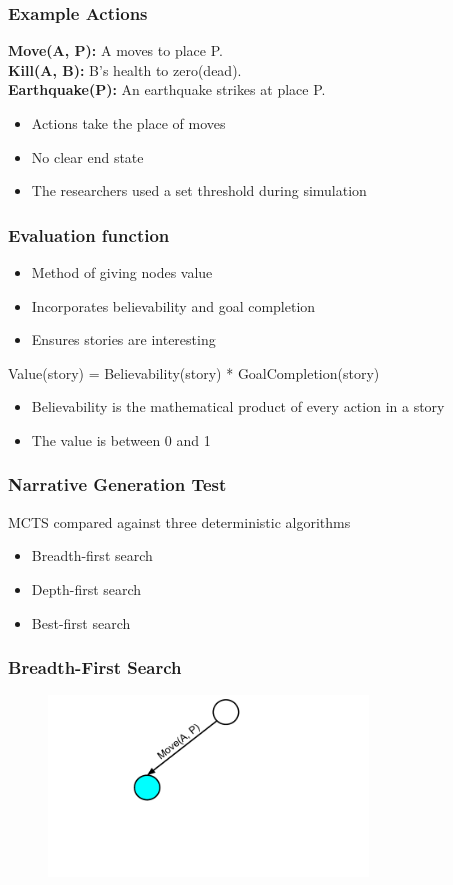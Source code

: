 \documentclass{beamer}
\begin{document}
\begin{frame}
\frametitle{Example Actions}
\textbf{Move(A, P):} A moves to place P. \\
\textbf{Kill(A, B):} B's health to zero(dead). \\
\textbf{Earthquake(P):} An earthquake strikes at place P.
\begin{itemize}
	\item Actions take the place of moves
	\item No clear end state
	\item The researchers used a set threshold during simulation
\end{itemize}
\end{frame}

\begin{frame}
\frametitle{Evaluation function}
\begin{itemize}
	\item Method of giving nodes value
	\item Incorporates believability and goal completion
	\item Ensures stories are interesting
\end{itemize}
Value(story) = Believability(story) * GoalCompletion(story) 
\begin{itemize}
	\item Believability is the mathematical product of every action in a story
	\item The value is between 0 and 1
\end{itemize}
\end{frame}

\begin{frame}
\frametitle{Narrative Generation Test}
MCTS compared against three deterministic algorithms
\begin{itemize}
	\item Breadth-first search
	\item Depth-first search
	\item Best-first search
\end{itemize}
\end{frame}

\begin{frame}[fragile]
\frametitle{Breadth-First Search}
\begin{figure}[h]
	\includegraphics[width=8.5cm]{Diagrams/BreadthFirst/BreadthTreeOne.pdf}
	\centering
\end{figure}
\end{frame}
\end{document}
